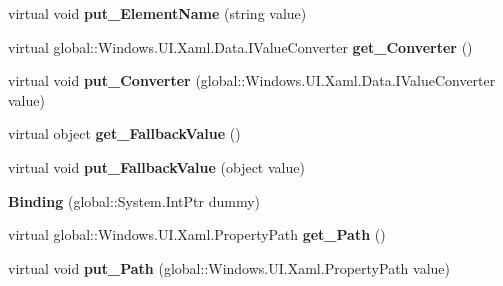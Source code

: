 \begin{DoxyCompactItemize}
virtual void {\bfseries put\+\_\+\+Element\+Name} (string value)
\item 
\mbox{\label{class_windows_1_1_u_i_1_1_xaml_1_1_data_1_1_binding_a75056d5c72401518166caead820596d9}} 
virtual global\+::\+Windows.\+U\+I.\+Xaml.\+Data.\+I\+Value\+Converter {\bfseries get\+\_\+\+Converter} ()
\item 
\mbox{\label{class_windows_1_1_u_i_1_1_xaml_1_1_data_1_1_binding_a5721074cd9c3ec7e50bd6d5b645234e7}} 
virtual void {\bfseries put\+\_\+\+Converter} (global\+::\+Windows.\+U\+I.\+Xaml.\+Data.\+I\+Value\+Converter value)
\item 
\mbox{\label{class_windows_1_1_u_i_1_1_xaml_1_1_data_1_1_binding_a907080aef9cb5f5df15684599707b3ba}} 
virtual object {\bfseries get\+\_\+\+Fallback\+Value} ()
\item 
\mbox{\label{class_windows_1_1_u_i_1_1_xaml_1_1_data_1_1_binding_ac1d4f41e87949cd4ffad38415709db6c}} 
virtual void {\bfseries put\+\_\+\+Fallback\+Value} (object value)
\item 
\mbox{\label{class_windows_1_1_u_i_1_1_xaml_1_1_data_1_1_binding_ae314033417c6ca80ae3826ead1750150}} 
{\bfseries Binding} (global\+::\+System.\+Int\+Ptr dummy)
\item 
\mbox{\label{class_windows_1_1_u_i_1_1_xaml_1_1_data_1_1_binding_a3670a1efb4d8824b1bc00bd91af01fc2}} 
virtual global\+::\+Windows.\+U\+I.\+Xaml.\+Property\+Path {\bfseries get\+\_\+\+Path} ()
\item 
\mbox{\label{class_windows_1_1_u_i_1_1_xaml_1_1_data_1_1_binding_a9f8d22b6891219f8db424a49a91ff24a}} 
virtual void {\bfseries put\+\_\+\+Path} (global\+::\+Windows.\+U\+I.\+Xaml.\+Property\+Path value)
\item 
\mbox{\label{class_windows_1_1_u_i_1_1_xaml_1_1_data_1_1_binding_ab0c392cb49f178e29a63d12a683e2c4f}} 

\end{DoxyCompactItemize}
